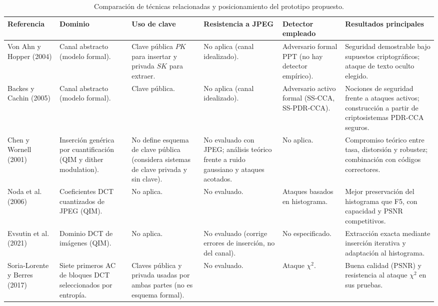 \documentclass[IB]{TFUOC}%
\begin{document}
\begin{table}[H]
\centering
\scriptsize
\caption{Comparación de técnicas relacionadas y posicionamiento del prototipo propuesto.}
\label{tab:estado_del_arte}
\begin{tabular}{|p{2.1cm}|p{2.2cm}|p{2.1cm}|p{2.5cm}|p{2.3cm}|p{3.2cm}|}
\hline
\rowcolor{uocnavy}
\color{white}\textbf{Referencia} &
\color{white}\textbf{Dominio} &
\color{white}\textbf{Uso de clave} &
\color{white}\textbf{Resistencia a JPEG} &
\color{white}\textbf{Detector empleado} &
\color{white}\textbf{Resultados principales} \\
\hline

Von Ahn y Hopper (2004) \cite{4} &
Canal abstracto (modelo formal). &
Clave pública $PK$ para insertar y privada $SK$ para extraer. &
No aplica (canal idealizado). &
Adversario formal $\mathrm{PPT}$ (no hay detector empírico). &
Seguridad demostrable bajo supuestos criptográficos; ataque de texto oculto elegido. \\
\hline

Backes y Cachin (2005) \cite{19} &
Canal abstracto (modelo formal). &
Clave pública. &
No aplica (canal idealizado). &
Adversario activo formal (SS-CCA, SS-PDR-CCA). &
Nociones de seguridad frente a ataques activos; construcción a partir de criptosistemas PDR-CCA seguros. \\
\hline

Chen y Wornell (2001) \cite{11} &
Inserción genérica por cuantificación (QIM y dither modulation). &
No define esquema de clave pública (considera sistemas de clave privada y sin clave). &
No evaluado con JPEG; análisis teórico frente a ruido gaussiano y ataques acotados. &
No aplica. &
Compromiso teórico entre tasa, distorsión y robustez; combinación con códigos correctores. \\
\hline

Noda et al. (2006) \cite{15} &
Coeficientes DCT cuantizados de JPEG (QIM). &
No aplica. &
No evaluado. &
Ataques basados en histograma. &
Mejor preservación del histograma que F5, con capacidad y $\mathrm{PSNR}$ competitivos. \\
\hline

Evsutin et al. (2021) \cite{14} &
Dominio DCT de imágenes (QIM). &
No aplica. &
No evaluado (corrige errores de inserción, no del canal). &
No especificado. &
Extracción exacta mediante inserción iterativa y adaptación al histograma. \\
\hline

Soria-Lorente y Berres (2017) \cite{13} &
Siete primeros AC de bloques DCT seleccionados por entropía. &
Claves pública y privada usadas por ambas partes (no es esquema formal). &
No evaluado. &
Ataque $\chi^2$. &
Buena calidad ($\mathrm{PSNR}$) y resistencia al ataque $\chi^2$ en sus pruebas. \\
\hline


\end{tabular}
\end{table}
\end{document}
